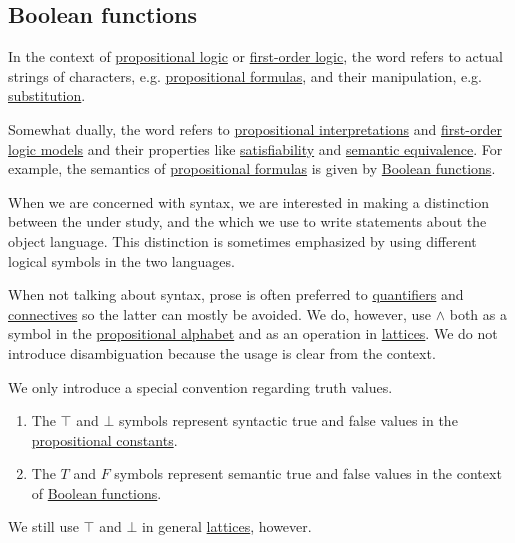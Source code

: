 \subsection{Boolean functions}\label{subsec:boolean_functions}

\begin{remark}\label{remark:metalanguage_syntax_and_semantics}
  In the context of \hyperref[subsec:propositional_logic]{propositional logic} or \hyperref[subsec:first_order_logic]{first-order logic}, the word  refers to actual strings of characters, e.g. \hyperref[def:propositional_language]{propositional formulas}, and their manipulation, e.g. \hyperref[def:propositional_substitution]{substitution}.

  Somewhat dually, the word  refers to \hyperref[def:propositional_interpretation]{propositional interpretations} and \hyperref[def:first_order_model]{first-order logic models} and their properties like \hyperref[def:propositional_model/satisfiability]{satisfiability} and \hyperref[def:propositional_model/equivalence]{semantic equivalence}. For example, the semantics of \hyperref[def:propositional_language]{propositional formulas} is given by \hyperref[def:boolean_function]{Boolean functions}.

  When we are concerned with syntax, we are interested in making a distinction between the  under study, and the  which we use to write statements about the object language. This distinction is sometimes emphasized by using different logical symbols in the two languages.

  When not talking about syntax, prose is often preferred to \hyperref[def:first_order_logic_alphabet/quantifiers]{quantifiers} and \hyperref[def:propositional_alphabet/connectives]{connectives} so the latter can mostly be avoided. We do, however, use \( \wedge \) both as a symbol in the \hyperref[def:propositional_alphabet]{propositional alphabet} and as an operation in \hyperref[def:binary_lattice_operations/meet]{lattices}. We do not introduce disambiguation because the usage is clear from the context.

  We only introduce a special convention regarding truth values.
  \begin{enumerate}
    \item The \( \top \) and \( \bot \) symbols represent syntactic true and false values in the \hyperref[def:propositional_alphabet/constants]{propositional constants}.
    \item The \( T \) and \( F \) symbols represent semantic true and false values in the context of \hyperref[def:boolean_function]{Boolean functions}.
  \end{enumerate}

  We still use \( \top \) and \( \bot \) in general \hyperref[def:lattice]{lattices}, however.
\end{remark}

